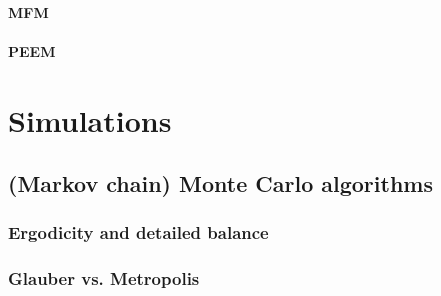 \paragraph{MFM}
\paragraph{PEEM}

\section{Simulations}\label{sec:sim}
\subsection{(Markov chain) Monte Carlo algorithms}
\subsubsection{Ergodicity and detailed balance}
\subsubsection{Glauber vs. Metropolis}
